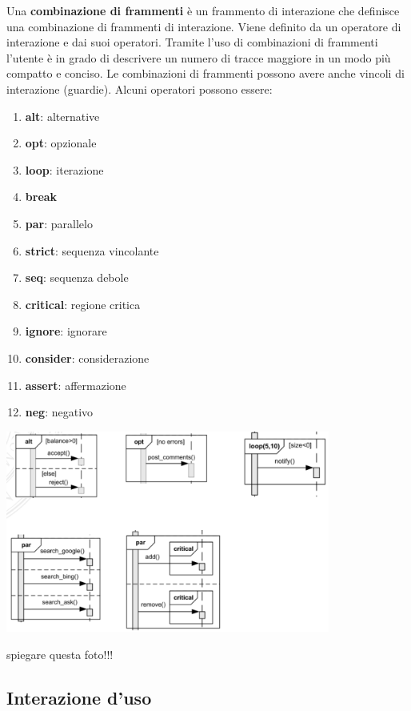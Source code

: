 \documentclass{article}
\begin{document}
Una \textbf{combinazione di frammenti} è un frammento di interazione che definisce una combinazione di frammenti di interazione. Viene definito da un operatore di interazione e dai suoi operatori. Tramite l'uso di combinazioni di frammenti l'utente è in grado di descrivere un numero di tracce maggiore in un modo più compatto e conciso. Le combinazioni di frammenti possono avere anche vincoli di interazione (guardie). Alcuni operatori possono essere:
\begin{enumerate}
    \renewcommand{\labelenumi}{-}
    \item \textbf{alt}: alternative
    \item \textbf{opt}: opzionale
    \item \textbf{loop}: iterazione 
    \item \textbf{break}
    \item \textbf{par}: parallelo
    \item \textbf{strict}: sequenza vincolante
    \item \textbf{seq}: sequenza debole
    \item \textbf{critical}: regione critica 
    \item \textbf{ignore}: ignorare
    \item \textbf{consider}: considerazione
    \item \textbf{assert}: affermazione
    \item \textbf{neg}: negativo
\end{enumerate}
\begin{center}
    \includegraphics[width=0.8\textwidth]{foto 13.png}
\end{center}
spiegare questa foto!!!

\subsection*{Interazione d'uso}
\large
\end{document}
